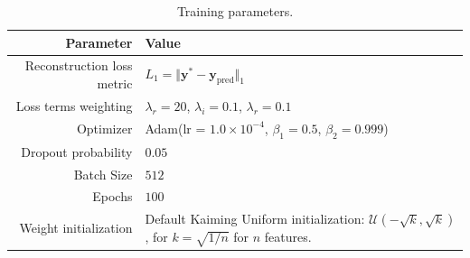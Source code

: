 \documentclass{article}
\theoremstyle{plain}
\theoremstyle{definition}
\theoremstyle{remark}
\newcommand{\vy}{\mathbf{y}}
\begin{document}
\begin{table}[htbp]
    \begin{center}
        \begin{tabular}{| r | p{} |}
            \hline
            \textbf{Parameter}         & \textbf{Value}                                                                                                     \\
            \hline
            \hline
            Reconstruction loss metric & $L_1 = \Vert \vy^{*} - \vy_{\mathrm{pred}} \Vert_1$                                                                \\
            Loss terms weighting       & $\lambda_r = 20$, $\lambda_i = 0.1$, $\lambda_r = 0.1$                                                             \\
            Optimizer                  & Adam(lr = $1.0 \times 10^{-4}$, $\beta_1 = 0.5$, $\beta_2 = 0.999$)                                                \\
            Dropout probability        & $0.05$                                                                                                             \\
            Batch Size                 & $512$                                                                                                              \\
            Epochs                     & $100$                                                                                                              \\
            Weight initialization      & Default Kaiming Uniform initialization: $\mathcal{U}(-\sqrt{k}, \sqrt{k})$, for $k = \sqrt{1/n}$ for $n$ features. \\
            \hline
        \end{tabular}
        \vspace{5pt}
        \caption{Training parameters.}
        \label{tab:parameters}
    \end{center}
\end{table}

\newpage
\end{document}
